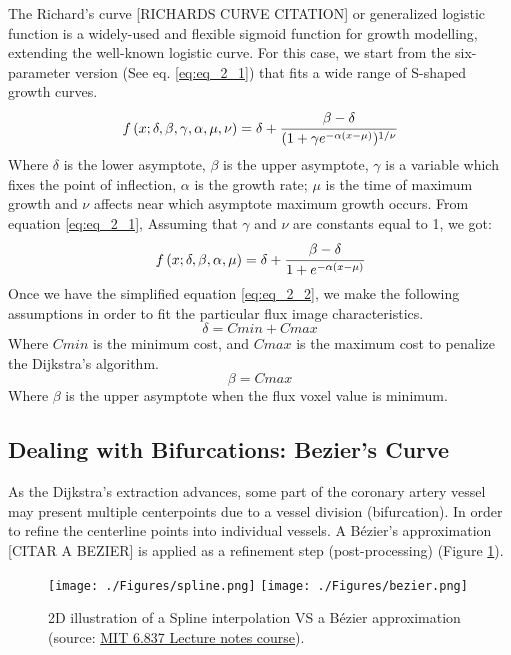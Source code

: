 The Richard's curve [RICHARDS CURVE CITATION] or generalized logistic function is a widely-used and flexible sigmoid function for growth modelling, extending the well-known logistic curve. For this case, we start from the six-parameter version (See eq. \ref{eq:eq_2_1}) that fits a wide range of S-shaped growth curves. 
\begin{equation}
\label{eq:eq_2_1}
f\left( x;\delta,\beta,\gamma,\alpha,\mu,\nu\right) = \delta + \cfrac{\beta-\delta}{(1+\gamma e^{-\alpha(x-\mu)})^{1/\nu}}
\end{equation}
Where $\delta$ is the lower asymptote, $\beta$ is the upper asymptote, $\gamma$ is a variable which fixes the point of inflection, $\alpha$ is the growth rate; $\mu$ is the time of maximum growth and $\nu$ affects near which asymptote maximum growth occurs.
From equation \ref{eq:eq_2_1}, Assuming that $\gamma$ and $\nu$ are constants equal to 1, we got:
\begin{equation}
\label{eq:eq_2_2}
f\left( x;\delta,\beta,\alpha,\mu\right) = \delta + \cfrac{\beta-\delta}{1+e^{-\alpha(x-\mu)}}
\end{equation}
Once we have the simplified equation \ref{eq:eq_2_2}, we make the following assumptions in order to fit the particular flux image characteristics.
\begin{equation}
\label{eq:eq_2_3}
\delta = Cmin + Cmax
\end{equation}
Where $Cmin$ is the minimum cost, and $Cmax$ is the maximum cost to penalize the Dijkstra's algorithm. 
\begin{equation}
\label{eq:eq_2_4}
\beta = Cmax
\end{equation}
Where $\beta$ is the upper asymptote when the flux voxel value is minimum.

\subsection{Dealing with Bifurcations: Bezier's Curve}

As the Dijkstra's extraction advances, some part of the coronary artery vessel may present multiple centerpoints due to a vessel division (bifurcation). In order to refine the centerline points into individual vessels. A B\'ezier's approximation [CITAR A BEZIER] is applied as a refinement step (post-processing) (Figure \ref{fig:sp_vs_bz}). 

\begin{figure}[ht]
	\centering
		\texttt{[image: ./Figures/spline.png]}
		\texttt{[image: ./Figures/bezier.png]}
	\caption[Spline interpolation VS B\'ezier approximation. ]{2D illustration of a Spline interpolation VS a B\'ezier approximation  (source: \href{http://ocw.mit.edu/courses/electrical-engineering-and-computer-science/6-837-computer-graphics-fall-2003/index.htm}{MIT 6.837 Lecture notes course}).}
	\label{fig:sp_vs_bz}
\end{figure}



